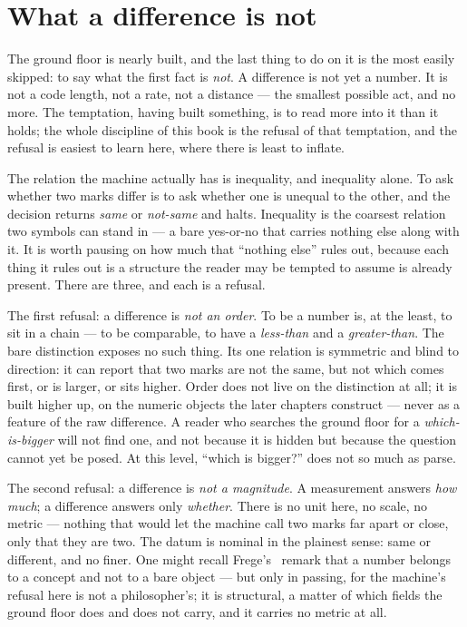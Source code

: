 \section{What a difference is not}

The ground floor is nearly built, and the last thing to do on it is the most easily skipped: to say what the first
fact is \emph{not}. A difference is not yet a number. It is not a code length, not a rate, not a distance --- the
smallest possible act, and no more. The temptation, having built something, is to read more into it than it holds; the
whole discipline of this book is the refusal of that temptation, and the refusal is easiest to learn here, where there
is least to inflate.

The relation the machine actually has is inequality, and inequality alone. To ask whether two marks differ is to ask
whether one is unequal to the other, and the decision returns \emph{same} or \emph{not-same} and halts. Inequality is
the coarsest relation two symbols can stand in --- a bare yes-or-no that carries nothing else along with it. It is
worth pausing on how much that ``nothing else'' rules out, because each thing it rules out is a structure the reader
may be tempted to assume is already present. There are three, and each is a refusal.

The first refusal: a difference is \emph{not an order}. To be a number is, at the least, to sit in a chain --- to be
comparable, to have a \emph{less-than} and a \emph{greater-than}. The bare distinction exposes no such thing. Its one
relation is symmetric and blind to direction: it can report that two marks are not the same, but not which comes first,
or is larger, or sits higher. Order does not live on the distinction at all; it is built higher up, on the numeric
objects the later chapters construct --- never as a feature of the raw difference. A reader who searches the ground
floor for a \emph{which-is-bigger} will not find one, and not because it is hidden but because the question cannot yet
be posed. At this level, ``which is bigger?'' does not so much as parse.

The second refusal: a difference is \emph{not a magnitude}. A measurement answers \emph{how much}; a difference
answers only \emph{whether}. There is no unit here, no scale, no metric --- nothing that would let the machine call two
marks far apart or close, only that they are two. The datum is nominal in the plainest sense: same or different, and no
finer. One might recall Frege's~\cite{frege1884} remark that a number belongs to a concept and not to a bare object ---
but only in passing, for the machine's refusal here is not a philosopher's; it is structural, a matter of which fields
the ground floor does and does not carry, and it carries no metric at all.

